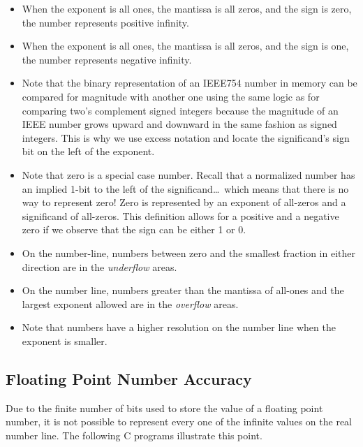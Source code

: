 \begin{itemize}
\item When the exponent is all ones, the mantissa is all zeros, and
the sign is zero, the number represents positive infinity.

\item When the exponent is all ones, the mantissa is all zeros, and
the sign is one, the number represents negative infinity.

\item Note that the binary representation of an IEEE754 number in memory
can be compared for magnitude with another one using the same logic as for
comparing two's complement signed integers because the magnitude of an 
IEEE number grows upward and downward in the same fashion as signed integers.
This is why we use excess notation and locate the significand's sign bit on
the left of the exponent.

\item Note that zero is a special case number.  Recall that a normalized
number has an implied 1-bit to the left of the significand\ldots\ which
means that there is no way to represent zero!
Zero is represented by an exponent of all-zeros and a significand of 
all-zeros.  This definition allows for a positive and a negative zero 
if we observe that the sign can be either 1 or 0.

\item On the number-line, numbers between zero and the smallest fraction in 
either direction are in the {\em \gls{underflow}} areas.

\item On the number line, numbers greater than the mantissa of all-ones and the 
largest exponent allowed are in the {\em \gls{overflow}} areas.

\item Note that numbers have a higher resolution on the number line when the 
exponent is smaller.
\end{itemize}

\subsection{Floating Point Number Accuracy}
Due to the finite number of bits used to store the value of a floating point
number, it is not possible to represent every one of the infinite values
on the real number line.  The following C programs illustrate this point.

